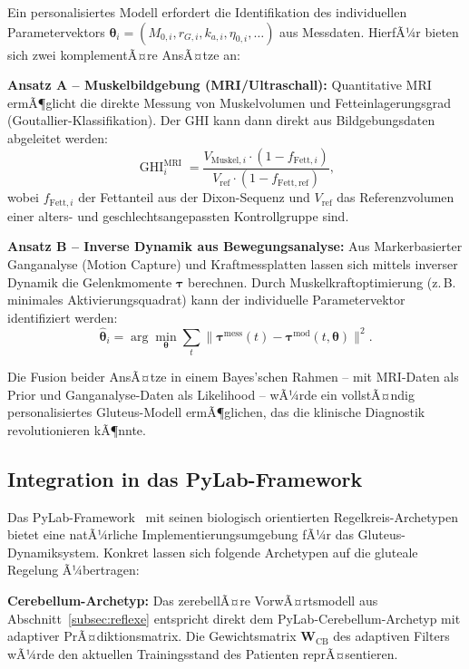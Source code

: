 ﻿\documentclass[12pt,a4paper]{report}
\theoremstyle{plain}
\theoremstyle{definition}
\theoremstyle{remark}
\DeclareMathOperator{\GHI}{GHI}
\begin{document}
	Ein personalisiertes Modell erfordert die Identifikation des individuellen
	Parametervektors $\boldsymbol{\theta}_i = (M_{0,i}, r_{G,i}, k_{a,i}, \eta_{0,i}, \ldots)$
	aus Messdaten. HierfÃ¼r bieten sich zwei komplementÃ¤re AnsÃ¤tze an:
	
	\textbf{Ansatz A -- Muskelbildgebung (MRI/Ultraschall):}
	Quantitative MRI ermÃ¶glicht die direkte Messung von Muskelvolumen und
	Fetteinlagerungsgrad (Goutallier-Klassifikation). Der GHI kann dann
	direkt aus Bildgebungsdaten abgeleitet werden:
	\[
	\GHI_i^{\mathrm{MRI}} = \frac{V_{\mathrm{Muskel},i} \cdot (1 - f_{\mathrm{Fett},i})}{V_{\mathrm{ref}} \cdot (1 - f_{\mathrm{Fett,ref}})},
	\]
	wobei $f_{\mathrm{Fett},i}$ der Fettanteil aus der Dixon-Sequenz und
	$V_{\mathrm{ref}}$ das Referenzvolumen einer alters- und geschlechtsangepassten
	Kontrollgruppe sind.
	
	\textbf{Ansatz B -- Inverse Dynamik aus Bewegungsanalyse:}
	Aus Markerbasierter Ganganalyse (Motion Capture) und Kraftmessplatten
	lassen sich mittels inverser Dynamik die Gelenkmomente $\boldsymbol{\tau}$
	berechnen. Durch Muskelkraftoptimierung (z.\,B. minimales Aktivierungsquadrat)
	kann der individuelle Parametervektor identifiziert werden:
	\[
	\hat{\boldsymbol{\theta}}_i = \arg\min_{\boldsymbol{\theta}}
	\sum_{t} \|\boldsymbol{\tau}^{\mathrm{mess}}(t) - \boldsymbol{\tau}^{\mathrm{mod}}(t, \boldsymbol{\theta})\|^2.
	\]
	
	Die Fusion beider AnsÃ¤tze in einem Bayes'schen Rahmen --
	mit MRI-Daten als Prior und Ganganalyse-Daten als Likelihood --
	wÃ¼rde ein vollstÃ¤ndig personalisiertes Gluteus-Modell ermÃ¶glichen,
	das die klinische Diagnostik revolutionieren kÃ¶nnte.
	
	\subsection{Integration in das PyLab-Framework}
	\label{subsec:pylab}
	
	Das PyLab-Framework~\cite{epp2026wolke} mit seinen biologisch orientierten
	Regelkreis-Archetypen bietet eine natÃ¼rliche Implementierungsumgebung
	fÃ¼r das Gluteus-Dynamiksystem. Konkret lassen sich folgende Archetypen
	auf die gluteale Regelung Ã¼bertragen:
	
	\textbf{Cerebellum-Archetyp:}
	Das zerebellÃ¤re VorwÃ¤rtsmodell aus Abschnitt~\ref{subsec:reflexe}
	entspricht direkt dem PyLab-Cerebellum-Archetyp mit adaptiver PrÃ¤diktionsmatrix.
	Die Gewichtsmatrix $\mathbf{W}_{\mathrm{CB}}$ des adaptiven Filters
	wÃ¼rde den aktuellen Trainingsstand des Patienten reprÃ¤sentieren.
	
\end{document}
